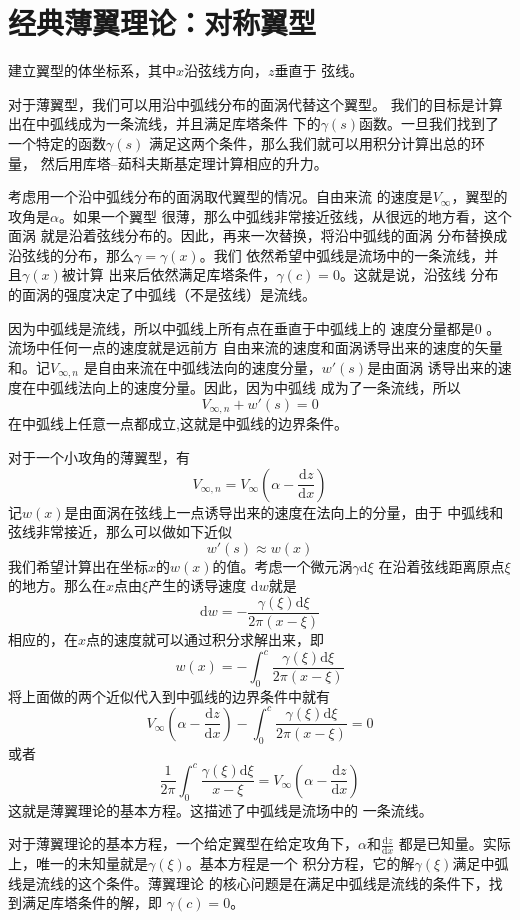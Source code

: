 \section{经典薄翼理论：对称翼型}
建立翼型的体坐标系，其中$x$沿弦线方向，$z$垂直于
弦线。

对于薄翼型，我们可以用沿中弧线分布的面涡代替这个翼型。
我们的目标是计算出在中弧线成为一条流线，并且满足库塔条件
下的$\gamma(s)$函数。一旦我们找到了一个特定的函数$\gamma(s)$
满足这两个条件，那么我们就可以用积分计算出总的环量，
然后用库塔--茹科夫斯基定理计算相应的升力。

考虑用一个沿中弧线分布的面涡取代翼型的情况。自由来流
的速度是$V_\infty$，翼型的攻角是$\alpha$。如果一个翼型
很薄，那么中弧线非常接近弦线，从很远的地方看，这个面涡
就是沿着弦线分布的。因此，再来一次替换，将沿中弧线的面涡
分布替换成沿弦线的分布，那么$\gamma=\gamma(x)$。我们
依然希望中弧线是流场中的一条流线，并且$\gamma(x)$被计算
出来后依然满足库塔条件，$\gamma(c)=0 $。这就是说，沿弦线
分布的面涡的强度决定了中弧线（不是弦线）是流线。

因为中弧线是流线，所以中弧线上所有点在垂直于中弧线上的
速度分量都是0 。流场中任何一点的速度就是远前方
自由来流的速度和面涡诱导出来的速度的矢量和。记$V_{\infty,n}$
是自由来流在中弧线法向的速度分量，$w'(s)$是由面涡
诱导出来的速度在中弧线法向上的速度分量。因此，因为中弧线
成为了一条流线，所以
\[
  V_{\infty,n}+w'(s)=0 
\]
在中弧线上任意一点都成立,这就是中弧线的边界条件。

对于一个小攻角的薄翼型，有
\[
  V_{\infty,n}=V_\infty(\alpha-\frac{\mathrm{d}z }{\mathrm{d}x})
\]
记$w(x)$是由面涡在弦线上一点诱导出来的速度在法向上的分量，由于
中弧线和弦线非常接近，那么可以做如下近似
\[
  w'(s)\approx w(x)
\]
我们希望计算出在坐标$x$的$w(x)$的值。考虑一个微元涡$\gamma \mathrm{d}\xi$
在沿着弦线距离原点$\xi$的地方。那么在$x$点由$\xi$产生的诱导速度
$\mathrm{d} w $就是
\[
  \mathrm{d} w=- \frac{\gamma(\xi) \mathrm{d} \xi}{2\pi(x-\xi)}
\]
相应的，在$x$点的速度就可以通过积分求解出来，即
\[
  w(x)=-\int _0^c \frac{\gamma (\xi)\mathrm{d}\xi}{2\pi(x-\xi)}
\]
将上面做的两个近似代入到中弧线的边界条件中就有
\[
  V_\infty(\alpha-\frac{\mathrm{d}z }{\mathrm{d}x})-\int _0^c \frac{\gamma(\xi)\mathrm{d}\xi}{2\pi(x-\xi)}=0
\]
或者
\[
  \frac{1}{2\pi}\int _0^c \frac{\gamma(\xi)\mathrm{d}\xi}{x-\xi}=V_\infty(\alpha-\frac{\mathrm{d} z }{\mathrm{d}x})
\]
这就是{\color{noteorange}薄翼理论的基本方程}。这描述了中弧线是流场中的
一条流线。

对于薄翼理论的基本方程，一个给定翼型在给定攻角下，$\alpha$和$\frac{\mathrm{d}z }{\mathrm{d}x}$
都是已知量。实际上，唯一的未知量就是$\gamma(\xi)$。基本方程是一个
积分方程，它的解$\gamma(\xi)$满足中弧线是流线的这个条件。薄翼理论
的核心问题是在满足中弧线是流线的条件下，找到满足库塔条件的解，即
$\gamma(c)=0 $。

